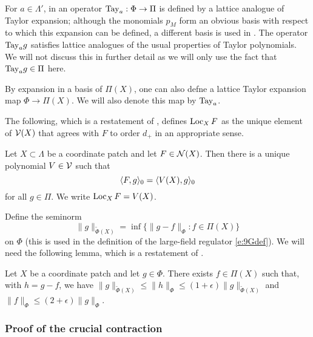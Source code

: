 For $a\in\Lambda'$, in \cite{BS-rg-loc} an operator ${\rm Tay}_a : \Phi \rightarrow \Pi$ is defined
by a lattice analogue of Taylor expansion; although the monomials $p_M$ form an obvious
basis with respect to which this expansion can be defined, a different basis is used in
\cite{BS-rg-loc}. The operator ${\rm Tay}_a g$ satisfies lattice analogues of the usual properties
of Taylor polynomials. We will not discuss this in further detail as we will only use the fact
that ${\rm Tay}_a g \in \Pi$ here.

\begin{rk}
\label{rk:TayX}
By expansion in a basis of $\Pi(X)$, one can also defne a lattice Taylor expansion map
$\Phi \to \Pi(X)$. We will also denote this map by ${\rm Tay}_a$.
\end{rk}

The following, which is a restatement of \cite[Proposition~\ref{loc-prop:LTsymexists}]{BS-rg-IE},
defines $\operatorname{Loc}_X F$ as the unique element of $\mathcal{V}(X)$ that agrees with $F$ to
order $d_+$ in an appropriate sense.

\begin{prop}
\label{prop:LTsymexists}
Let $X\subset\Lambda$ be a coordinate patch and let $F\in\mathcal{N}(X)$.
Then there is a unique polynomial $V\in\mathcal{V}$ such that
\begin{equation}
\langle F, g \rangle_0 = \langle V(X), g \rangle_0
\end{equation}
for all $g\in\Pi$. We write $\operatorname{Loc}_X F = V(X)$.
\end{prop}

Define the seminorm
\begin{equation}
\label{e:Phitilde}
\|g\|_{\tilde\Phi(X)} = \inf\{ \|g - f\|_\Phi : f\in\Pi(X) \}
\end{equation}
on $\Phi$ (this is used in the definition of the large-field
regulator \eqref{e:9Gdef}).
We will need the following lemma, which is a restatement of
\cite[Lemma~\ref{loc-lem:testfndecomp}]{BS-rg-loc}.

\begin{lemma}
\label{lem:testfndecomp}
Let $X$ be a coordinate patch and let $g\in\Phi$.
There exists $f\in\Pi(X)$ such that, with $h = g - f$, we have
$\|g\|_{\tilde\Phi(X)} \le \|h\|_\Phi \le (1 + \epsilon) \|g\|_{\tilde\Phi(X)}$
and $\|f\|_\Phi \le (2 + \epsilon) \|g\|_\Phi$.
\end{lemma}

\subsubsection{Proof of the crucial contraction}

